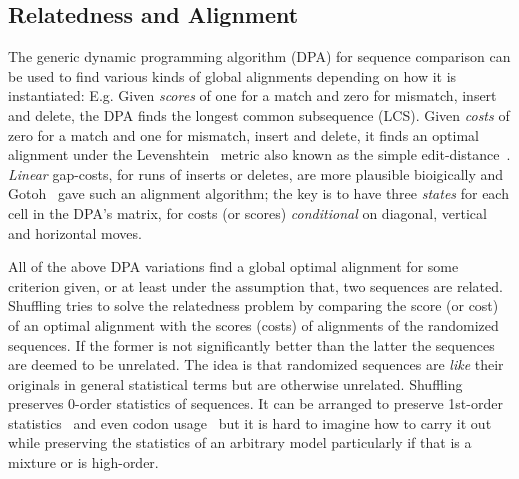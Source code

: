 \documentclass[letterpaper,11pt,oneside]{article}
\begin{document}
\subsection{Relatedness and Alignment} \label{sec:rel}

The generic dynamic programming algorithm (DPA) for
sequence comparison can be used to find various kinds
of global alignments depending on how it is instantiated: E.g.
Given {\em scores} of one for a match and zero for mismatch, insert and delete,
the DPA finds the longest common subsequence (LCS).
Given {\em costs} of zero for a match and one for mismatch, insert and delete,
it finds an optimal alignment under the Levenshtein~\cite{levenshtein66}
metric also known as the simple edit-distance~\cite{sellers}.
{\em Linear} gap-costs, for runs of inserts or deletes,
are more plausible bioigically and Gotoh~\cite{gotoh82}
gave such an alignment algorithm; the key is to have three {\em states}
for each cell in the DPA's matrix, for costs (or scores)
{\em conditional} on diagonal, vertical and horizontal moves.

All of the above DPA variations find a global optimal alignment for
some criterion given, or at least under the assumption that,
two sequences are related.
Shuffling tries to solve the relatedness problem by comparing the
score (or cost) of an optimal alignment with the scores (costs)
of alignments of the randomized sequences.
If the former is not significantly better than the latter
the sequences are deemed to be unrelated.
The idea is that randomized sequences are {\em like} their originals in
general statistical terms but are otherwise unrelated.
Shuffling preserves 0-order statistics of sequences.
It can be arranged to preserve 1st-order statistics~\cite{fitch83}
and even codon usage~\cite{altschul85} but it is hard to imagine how
to carry it out while preserving the statistics of an arbitrary model
particularly if that is a mixture or is high-order.
\end{document}
